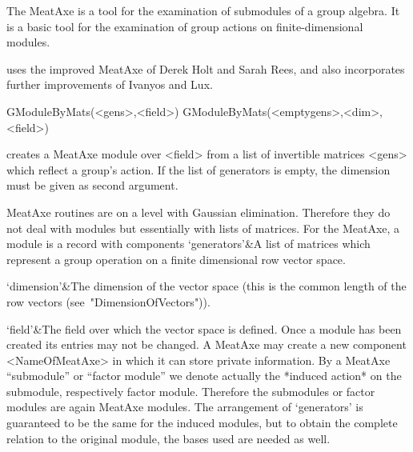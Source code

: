 

The MeatAxe \cite{Par84} is a tool for the examination of submodules of a
group algebra. It is a basic tool for the examination of group actions on
finite-dimensional modules.

{\GAP} uses the improved MeatAxe of Derek Holt and Sarah Rees, and
also incorporates further improvements of Ivanyos and Lux.



\>GModuleByMats(<gens>,<field>)
\>GModuleByMats(<emptygens>,<dim>,<field>)

creates a MeatAxe module over <field> from a list of invertible matrices 
<gens> which reflect a group's action. If the list of generators is empty,
the dimension must be given as second argument.

MeatAxe routines are on a level with Gaussian elimination. Therefore they do
not deal with {\GAP} modules but essentially with lists of matrices. For the
MeatAxe, a module is a record with components
\beginitems
`generators'&A list of matrices which represent a group operation on a
finite dimensional row vector space.

`dimension'&The dimension of the vector space (this is the common length of
the row vectors (see~"DimensionOfVectors")).

`field'&The field over which the vector space is defined.
\enditems
Once a module has been created its entries may not be changed. A MeatAxe may
create a new component <NameOfMeatAxe> in which it can store private
information. By a MeatAxe ``submodule'' or ``factor module'' we denote
actually the *induced action* on the submodule, respectively factor module.
Therefore the submodules or factor modules are again MeatAxe modules. The
arrangement of `generators' is guaranteed to be the same for the induced
modules, but to obtain the complete relation to the original module, the
bases used are needed as well.


